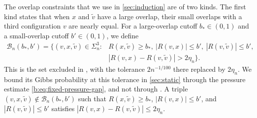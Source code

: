 The overlap constraints that we use in \cref{sec:induction} are of two
kinds. The first kind states that when $x$ and ${\widetilde v}$ have a large overlap,
their small overlaps with a third configuration $v$ are nearly equal. For a
large-overlap cutoff $b_*\in(0,1)$ and a small-overlap cutoff $b'\in(0,1)$, we
define
\begin{equation}\label{eq:ref-fixed-violation}
 \begin{aligned}
 \mathcal B_n(b_*,b')=\bigl\{(v,x,{\widetilde v})\in\Sigma_n^3:{}
   &R(x,{\widetilde v})\ge b_*,\ |R(v,x)|\le b',\ |R(v,{\widetilde v})|\le b',\\
   &|R(v,x)-R(v,{\widetilde v})|>2\eta_n\bigr\}.
 \end{aligned}
\end{equation}
This is the set excluded in \cite[Lemma~4.1]{oai-barriers}, with the
tolerance $2n^{-1/100}$ there replaced by $2\eta_n$. We bound its Gibbs
probability at this tolerance in \cref{sec:static} through the pressure
estimate \eqref{b:eq:fixed-pressure-gap}, and not through
\cite[Lemma~4.1]{oai-barriers}. A triple
$(v,x,{\widetilde v})\notin\mathcal B_n(b_*,b')$ such that $R(x,{\widetilde v})\ge b_*$,
$|R(v,x)|\le b'$, and $|R(v,{\widetilde v})|\le b'$ satisfies
$|R(v,x)-R(v,{\widetilde v})|\le2\eta_n$.

